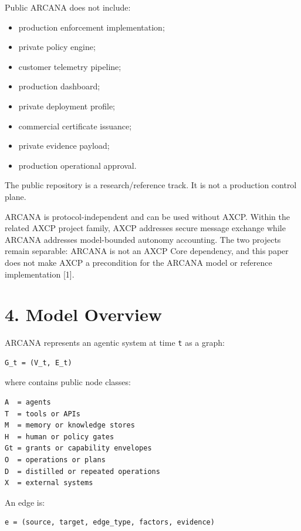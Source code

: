 \documentclass[
  american,
  a4paper,
  10pt]{article}
\providecommand{\tightlist}{%
  \setlength{\itemsep}{0pt}\setlength{\parskip}{0pt}}
\begin{document}
Public ARCANA does not include:

\begin{itemize}
\tightlist
\item
  production enforcement implementation;
\item
  private policy engine;
\item
  customer telemetry pipeline;
\item
  production dashboard;
\item
  private deployment profile;
\item
  commercial certificate issuance;
\item
  private evidence payload;
\item
  production operational approval.
\end{itemize}

The public repository is a research/reference track. It is not a production control
plane.

ARCANA is protocol-independent and can be used without AXCP. Within the related AXCP
project family, AXCP addresses secure message exchange while ARCANA addresses
model-bounded autonomy accounting. The two projects remain separable: ARCANA is not an
AXCP Core dependency, and this paper does not make AXCP a precondition for the ARCANA
model or reference implementation {[}1{]}.

\section{4. Model Overview}\label{4-model-overview}

ARCANA represents an agentic system at time \texttt{t} as a graph:

\begin{Verbatim}[breaklines=true,breakanywhere=true,fontsize=\small]
G_t = (V_t, E_t)
\end{Verbatim}

where  contains public node classes:

\begin{Verbatim}[breaklines=true,breakanywhere=true,fontsize=\small]
A  = agents
T  = tools or APIs
M  = memory or knowledge stores
H  = human or policy gates
Gt = grants or capability envelopes
O  = operations or plans
D  = distilled or repeated operations
X  = external systems
\end{Verbatim}

An edge is:

\begin{Verbatim}[breaklines=true,breakanywhere=true,fontsize=\small]
e = (source, target, edge_type, factors, evidence)
\end{Verbatim}
\end{document}
